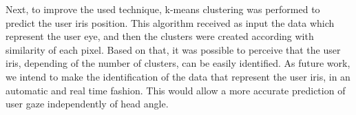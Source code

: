 \documentclass[10pt, conference]{IEEEtran}
\begin{document}
	Next, to improve the used technique, k-means clustering was performed to predict the user iris position. 
	This algorithm received as input the data which represent the user eye, and then the clusters were created according with similarity of each pixel. 
	Based on that, it was possible to perceive that the user iris, depending of the number of clusters, can be easily identified.
	As future work, we intend to make the identification of the data that represent the user iris, in an automatic and real time fashion. 
	This would allow a more accurate prediction of user gaze independently of head angle.



\balance

\balance
\end{document}
